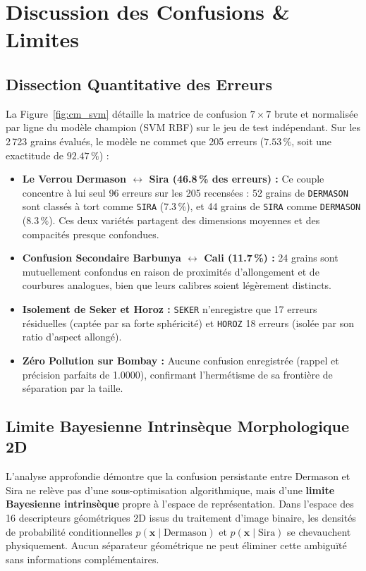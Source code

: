 \documentclass[10pt,a4paper,twocolumn]{article}
\begin{document}
\section{Discussion des Confusions \& Limites}
\label{sec:errors}

\subsection{Dissection Quantitative des Erreurs}
La Figure~\ref{fig:cm_svm} détaille la matrice de confusion $7 \times 7$ brute et normalisée par ligne du modèle champion (SVM RBF) sur le jeu de test indépendant. Sur les 2\,723 grains évalués, le modèle ne commet que 205 erreurs ($7.53\,\%$, soit une exactitude de $92.47\,\%$) :
\begin{itemize}
    \item \textbf{Le Verrou Dermason $\leftrightarrow$ Sira (46.8\,\% des erreurs) :} Ce couple concentre à lui seul 96 erreurs sur les 205 recensées : 52 grains de \texttt{DERMASON} sont classés à tort comme \texttt{SIRA} ($7.3\,\%$), et 44 grains de \texttt{SIRA} comme \texttt{DERMASON} ($8.3\,\%$). Ces deux variétés partagent des dimensions moyennes et des compacités presque confondues.
    \item \textbf{Confusion Secondaire Barbunya $\leftrightarrow$ Cali (11.7\,\%) :} 24 grains sont mutuellement confondus en raison de proximités d'allongement et de courbures analogues, bien que leurs calibres soient légèrement distincts.
    \item \textbf{Isolement de Seker et Horoz :} \texttt{SEKER} n'enregistre que 17 erreurs résiduelles (captée par sa forte sphéricité) et \texttt{HOROZ} 18 erreurs (isolée par son ratio d'aspect allongé).
    \item \textbf{Zéro Pollution sur Bombay :} Aucune confusion enregistrée (rappel et précision parfaits de 1.0000), confirmant l'hermétisme de sa frontière de séparation par la taille.
\end{itemize}

\subsection{Limite Bayesienne Intrinsèque Morphologique 2D}
L'analyse approfondie démontre que la confusion persistante entre Dermason et Sira ne relève pas d'une sous-optimisation algorithmique, mais d'une \textbf{limite Bayesienne intrinsèque} propre à l'espace de représentation. Dans l'espace des 16 descripteurs géométriques 2D issus du traitement d'image binaire, les densités de probabilité conditionnelles $p(\mathbf{x} \mid \text{Dermason})$ et $p(\mathbf{x} \mid \text{Sira})$ se chevauchent physiquement. Aucun séparateur géométrique ne peut éliminer cette ambiguïté sans informations complémentaires.
\end{document}
